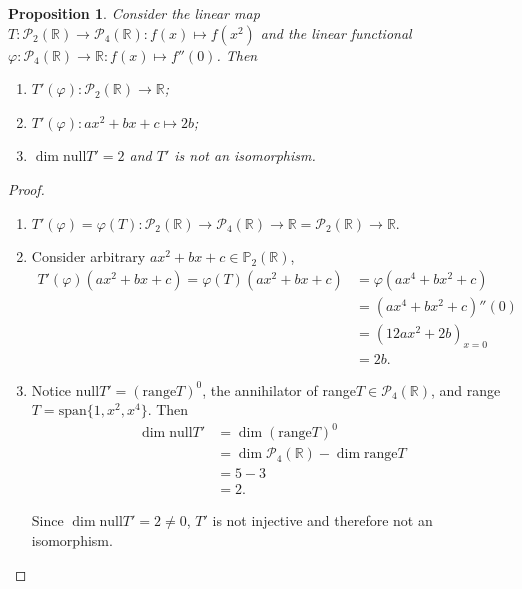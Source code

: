 \documentclass{article}
\newtheorem{proposition}[thm]{Proposition}
\begin{document}
\begin{proposition}
    Consider the linear map $T:\mathcal{P}_2(\mathbb{R})\to\mathcal{P}_4(\mathbb{R}):f(x)\mapsto
    f(x^2)$ and the linear functional $\varphi:\mathcal{P}_4(\mathbb{R})\to\mathbb{R}:
    f(x)\mapsto f''(0)$. Then 
    \begin{enumerate}[label=(\alph*)]
        \item $T'(\varphi):\mathcal{P}_2(\mathbb{R})\to\mathbb{R}$;
        \item $T'(\varphi):ax^2+bx+c\mapsto 2b$;
        \item $\dim \mathrm{null}T' = 2$ and $T'$ is not an isomorphism.
    \end{enumerate}
\end{proposition}
\begin{proof}\indent
    \begin{enumerate}[label=(\alph*)]
        \item $T'(\varphi) = \varphi(T):\mathcal{P}_2(\mathbb{R})\to\mathcal{P}_4(\mathbb{R})
        \to \mathbb{R} = \mathcal{P}_2(\mathbb{R})\to \mathbb{R}$.
    
        \item 
        Consider arbitrary $ax^2+bx+c\in\mathbb{P}_2(\mathbb{R})$, 
        \begin{align*}
            T'(\varphi)(ax^2+bx+c) = \varphi(T)(ax^2+bx+c) & = \varphi(ax^4+bx^2+c) \\
            & = (ax^4+bx^2+c)''(0) \\
            & = (12ax^2+2b)_{x=0} \\
            & = 2b.
        \end{align*}

        \item 
        Notice $\mathrm{null}T' = (\mathrm{range}T)^0$, the annihilator of 
        range$T\in\mathcal{P}_4(\mathbb{R})$, and range$T=\mathrm{span}\{1,x^2,x^4\}$. 
        Then 
        \begin{align*}
            \dim \mathrm{null}T' & = \dim (\mathrm{range}T)^0 \\
            & = \dim \mathcal{P}_4(\mathbb{R})-\dim \mathrm{range}T \\
            & = 5 - 3 \\
            & = 2.
        \end{align*}

        Since $\dim \mathrm{null}T' = 2\neq 0$, $T'$ is not injective and therefore not an 
        isomorphism.
    \end{enumerate}
\end{proof}
\end{document}
